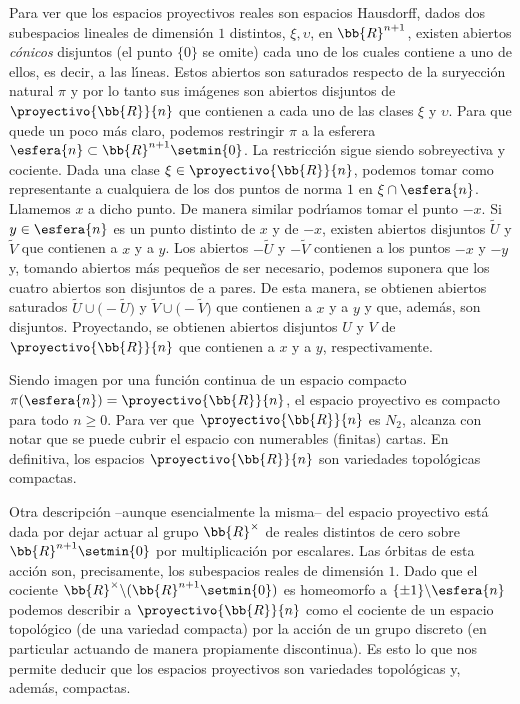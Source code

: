 \begin{ejemplo}
	Para ver que los espacios proyectivos reales son espacios Hausdorff,
	dados dos subespacios lineales de dimensi\'{o}n $1$ distintos,
	$\xi,\upsilon$, en $\bb{R}^{n+1}$, existen abiertos
	\emph{c\'{o}nicos} disjuntos (el punto $\{0\}$ se omite) cada uno
	de los cuales contiene a uno de ellos, es decir, a las
	l\'{\i}neas. Estos abiertos son saturados respecto de la
	suryecci\'{o}n natural $\pi$ y por lo tanto sus im\'{a}genes son
	abiertos disjuntos de $\proyectivo{\bb{R}}{n}$ que contienen a
	cada uno de las clases $\xi$ y $\upsilon$. Para que quede un poco
	m\'{a}s claro, podemos restringir $\pi$ a la esferera
	$\esfera{n}\subset\bb{R}^{n+1}\setmin\{0\}$. La restricci\'{o}n
	sigue siendo sobreyectiva y cociente. Dada una clase
	$\xi\in\proyectivo{\bb{R}}{n}$, podemos tomar como representante
	a cualquiera de los dos puntos de norma $1$ en $\xi\cap\esfera{n}$.
	Llamemos $x$ a dicho punto. De manera similar podr\'{\i}amos tomar
	el punto $-x$. Si $y\in\esfera{n}$ es un punto distinto de $x$ y de
	$-x$, existen abiertos disjuntos $\widetilde{U}$ y $\widetilde{V}$
	que contienen a $x$ y a $y$. Los abiertos $-\widetilde{U}$ y
	$-\widetilde{V}$ contienen a los puntos $-x$ y $-y$ y, tomando
	abiertos m\'{a}s peque\~{n}os de ser necesario, podemos suponera
	que los cuatro abiertos son disjuntos de a pares. De esta manera,
	se obtienen abiertos saturados
	$\widetilde{U}\cup\big(-\widetilde{U}\big)$ y
	$\widetilde{V}\cup\big(-\widetilde{V}\big)$ que contienen a $x$ y a
	$y$ y que, adem\'{a}s, son disjuntos. Proyectando, se obtienen
	abiertos disjuntos $U$ y $V$ de $\proyectivo{\bb{R}}{n}$ que
	contienen a $x$ y a $y$, respectivamente.

	Siendo imagen por una funci\'{o}n continua de un espacio compacto
	$\pi(\esfera{n})=\proyectivo{\bb{R}}{n}$, el espacio proyectivo
	es compacto para todo $n\geq 0$. Para ver que
	$\proyectivo{\bb{R}}{n}$ es $N_{2}$, alcanza con notar que se
	puede cubrir el espacio con numerables (finitas) cartas. En
	definitiva, los espacios $\proyectivo{\bb{R}}{n}$ son variedades
	topol\'{o}gicas compactas.
	
	Otra descripci\'{o}n --aunque esencialmente la misma-- del espacio
	proyectivo est\'{a} dada por dejar actuar al grupo $\bb{R}^{\times}$
	de reales distintos de cero sobre $\bb{R}^{n+1}\setmin\{0\}$ por
	multiplicaci\'{o}n por escalares. Las \'{o}rbitas de esta acci\'{o}n
	son, precisamente, los subespacios reales de dimensi\'{o}n $1$. Dado
	que el cociente $\bb{R}^{\times}\backslash(\bb{R}^{n+1}\setmin\{0\})$
	es homeomorfo a $\{\pm1\}\backslash\esfera{n}$ podemos describir a
	$\proyectivo{\bb{R}}{n}$ como el cociente de un espacio
	topol\'{o}gico (de una variedad compacta) por la acci\'{o}n de un
	grupo discreto (en particular actuando de manera propiamente
	discontinua). Es esto lo que nos permite deducir que los espacios
	proyectivos son variedades topol\'{o}gicas y, adem\'{a}s, compactas.
\end{ejemplo}

